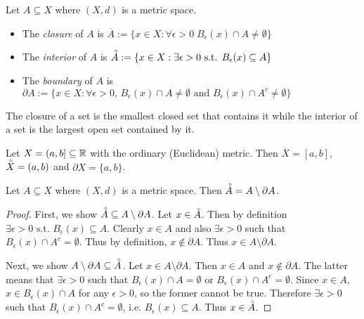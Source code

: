 \documentclass{article}
\begin{document}
\begin{definition}
Let $A\subseteq X$ where $(X,d)$ is a metric space. 
\begin{itemize}
    \item The \emph{closure} of $A$ is  $\overline A :=\{x \in X: \forall \epsilon > 0 \; B_\epsilon(x) \cap A \neq \emptyset \}$
    \item The \emph{interior} of $A$ is  $\accentset{\circ} A :=\{x \in X: \exists \epsilon > 0 \text{ s.t. } B_\epsilon(x) \subseteq A \}$
    \item The \emph{boundary} of $A$ is $\partial A := \{ x \in X: \forall \epsilon > 0, \, B_\epsilon(x) \cap A \neq \emptyset \text{ and }  B_\epsilon(x) \cap A^c \neq \emptyset\}$
\end{itemize}
\end{definition}
The closure of a set is the smallest closed set that contains it while the interior of a set is the largest open set contained by it.

\begin{example}
Let $X = (a, b] \subseteq {\mathbb{R}}$ with the ordinary (Euclidean) metric. Then $\overline X = [a,b]$, $\accentset{\circ} X = (a,b)$ and $\partial X = \{a,b\}$.
\end{example}

\begin{proposition}
 Let $A\subseteq X$ where $(X,d)$ is a metric space. Then $\accentset{\circ} A = A \setminus \partial A$.
\end{proposition}
\begin{proof}
First, we show $\accentset{\circ} A\subseteq A \setminus \partial A$. Let $x \in \accentset{\circ} A$. Then by definition $\exists \epsilon > 0 \text{ s.t. } B_\epsilon(x) \subseteq A$. Clearly $x \in A$ and also $\exists \epsilon > 0$ such that $B_\epsilon(x) \cap A^c = \emptyset$. Thus by definition, $x \notin \partial A$. Thus $x \in A \setminus \partial A$.

Next, we show $A \setminus \partial A \subseteq \accentset{\circ} A$. Let $x \in A \setminus \partial A$. Then $x \in A$ and $x \notin \partial A$. The latter means that $\exists \epsilon > 0$ such that $B_\epsilon(x) \cap A = \emptyset$ or  $B_\epsilon(x) \cap A^c = \emptyset$. Since $x \in A$, $x \in B_\epsilon(x) \cap A$ for any $\epsilon > 0$, so the former cannot be true. Therefore $\exists \epsilon > 0$ such that $B_\epsilon(x) \cap A^c = \emptyset$, i.e. $B_\epsilon(x) \subseteq A$. Thus $x \in \accentset{\circ} A$.
\end{proof}
\end{document}
